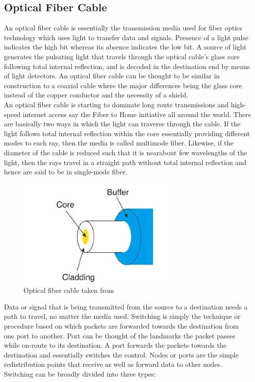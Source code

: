 \documentclass{home_assignment}
\begin{document}
\subsection*{Optical Fiber Cable} 
An optical fiber cable is essentially the transmission media used for fiber optics technology which uses light to transfer data and signals. Presence of a light pulse indicates the high bit whereas its absence indicates the low bit. A source of light generates the pulsating light that travels through the optical cable’s glass core following total internal reflection, and is decoded in the destination end by means of light detectors. An optical fiber cable can be thought to be similar in construction to a coaxial cable where the major differences being the glass core instead of the copper conductor and the necessity of a shield.\\An optical fiber cable is starting to dominate long route transmissions and high-speed internet access say the Fiber to Home initiative all around the world. There are basically two ways in which the light can traverse through the cable. If the light follows total internal reflection within the core essentially providing different modes to each ray, then the media is called multimode fiber. Likewise, if the diameter of the cable is reduced such that it is nearabout few wavelengths of the light, then the rays travel in a straight path without total internal reflection and hence are said to be in single-mode fiber.
\begin{figure}[H]
\centering
\includegraphics[scale=1]{./Figures/optical.jpg}
\caption{Optical fiber cable taken from \cite{optical}}
\label{fig:coaxial}
\end{figure}
Data or signal that is being transmitted from the source to a destination needs a path to travel, no matter the media used. Switching is simply the technique or procedure based on which packets are forwarded towards the destination from one port to another. Port can be thought of the landmarks the packet passes while on-route to its destination. A port forwards the packets towards the destination and essentially switches the control. Nodes or ports are the simple redistribution points that receive as well as forward data to other nodes.\\Switching can be broadly divided into three types:
\end{document}
